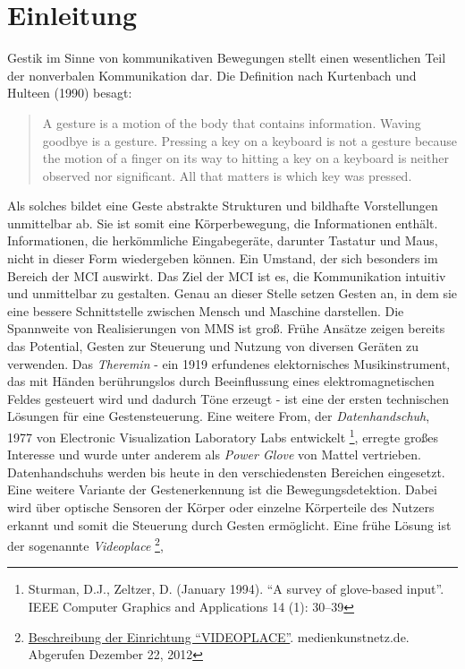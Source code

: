 \chapter{Einleitung}
\label{chap:Einleitung}
Gestik im Sinne von kommunikativen Bewegungen stellt einen wesentlichen Teil der nonverbalen Kommunikation dar. Die Definition nach Kurtenbach und Hulteen (1990) besagt:
\begin{quote}
A gesture is a motion of the body that contains information. Waving goodbye is a gesture.
Pressing a key on a keyboard is not a gesture because the motion of a finger on its way to hitting a key on a keyboard is neither observed nor significant.
All that matters is which key was pressed.
\end{quote}
Als solches bildet eine Geste abstrakte Strukturen und bildhafte Vorstellungen unmittelbar ab. Sie ist somit eine K\"orperbewegung, 
die Informationen enth\"alt. Informationen, die herk\"ommliche Eingabeger\"ate, darunter Tastatur und Maus, nicht in dieser Form wiedergeben k\"onnen.
Ein Umstand, der sich besonders im Bereich der \gls{MCI} auswirkt.
Das Ziel der \gls{MCI} ist es, die Kommunikation intuitiv und unmittelbar zu gestalten.
Genau an dieser Stelle setzen Gesten an, in dem sie eine bessere Schnittstelle zwischen Mensch und Maschine darstellen.
\newline
Die Spannweite von Realisierungen von \gls{MMS} ist gro\ss .
Fr\"uhe Ans\"atze zeigen bereits das Potential, Gesten zur Steuerung und Nutzung von diversen Ger\"aten zu verwenden. Das \textit{Theremin} - 
ein 1919 erfundenes elektornisches Musikinstrument, das mit H\"anden ber\"uhrungslos durch Beeinflussung eines elektromagnetischen Feldes 
gesteuert wird und dadurch T\"one erzeugt - ist eine der ersten technischen L\"osungen f\"ur eine Gestensteuerung.
Eine weitere From, der \textit{\gls{Datenhandschuh}}, 1977 von Electronic Visualization Laboratory Labs entwickelt
\footnote{Sturman, D.J., Zeltzer, D. (January 1994). \enquote{A survey of glove-based input}. IEEE Computer Graphics and Applications 14 (1): 30–39}, 
erregte gro\ss es Interesse und wurde unter anderem als \textit{Power Glove} von Mattel vertrieben.
\glspl{Datenhandschuh} werden bis heute in den verschiedensten Bereichen eingesetzt.
\newline
Eine weitere Variante der Gestenerkennung ist die \gls{Bewegungsdetektion}. Dabei wird \"uber optische Sensoren der K\"orper oder einzelne K\"orperteile
des Nutzers erkannt und somit die Steuerung durch Gesten erm\"oglicht. Eine fr\"uhe L\"osung ist der sogenannte \textit{Videoplace} \footnote{\href{http://www.medienkunstnetz.de/works/videoplace/}{Beschreibung der Einrichtung \enquote{VIDEOPLACE}}. medienkunstnetz.de. Abgerufen Dezember 22, 2012},
